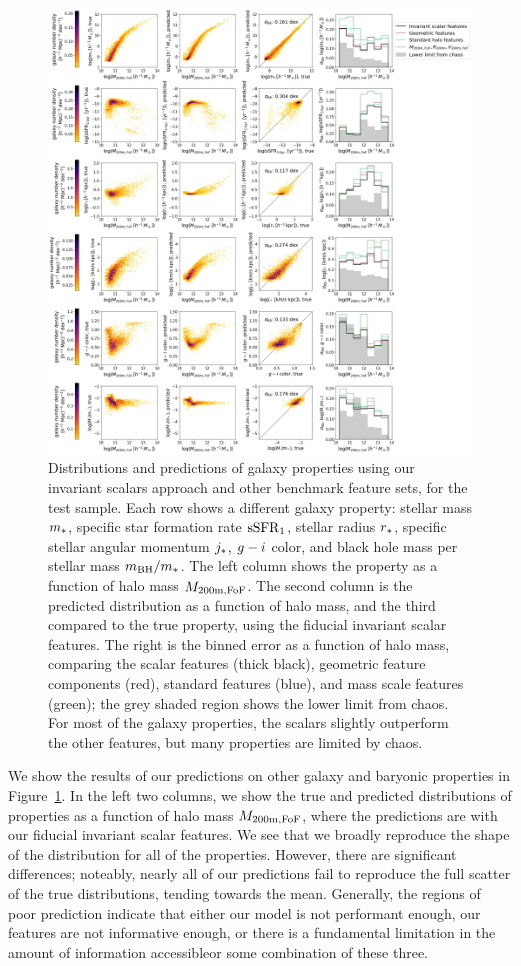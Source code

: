 \begin{figure}
    \centering
    \includegraphics[width=0.87\columnwidth]{pred_galprops.png}
    \caption{Distributions and predictions of galaxy properties using our invariant scalars approach and other benchmark feature sets, for the test sample. 
    Each row shows a different galaxy property: stellar mass $m_*$, specific star formation rate $\mathrm{sSFR}_1$, stellar radius $r_*$, specific stellar angular momentum $j_*$, $g-i$ color, and black hole mass per stellar mass $m_\mathrm{BH}/m_*$. 
    The left column shows the property as a function of halo mass $M_\mathrm{200m,FoF}$. 
    The second column is the predicted distribution as a function of halo mass, and the third compared to the true property, using the fiducial invariant scalar features.
    The right is the binned error as a function of halo mass, comparing the scalar features (thick black), geometric feature components (red), standard features (blue), and mass scale features (green); the grey shaded region shows the lower limit from chaos.
    For most of the galaxy properties, the scalars slightly outperform the other features, but many properties are limited by chaos.
    }
    \label{fig:galprops}
\end{figure}

We show the results of our predictions on other galaxy and baryonic properties in Figure~\ref{fig:galprops}.
In the left two columns, we show the true and predicted distributions of properties as a function of halo mass $M_\mathrm{200m,FoF}$, where the predictions are with our fiducial invariant scalar features.
We see that we broadly reproduce the shape of the distribution for all of the properties. 
However, there are significant differences; noteably, nearly all of our predictions fail to reproduce the full scatter of the true distributions, tending towards the mean.
Generally, the regions of poor prediction indicate that either our model is not performant enough, our features are not informative enough, or there is a fundamental limitation in the amount of information accessible{\emdash}or some combination of these three.

